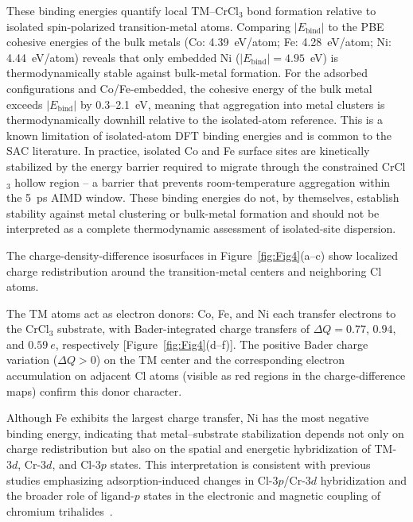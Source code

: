 \documentclass[journal=jacsat,manuscript=article]{achemso}
\begin{document}
These binding energies quantify local TM--CrCl$_3$ bond formation relative to isolated spin-polarized transition-metal atoms. {\color{revcolor}%
  Comparing $|E_{\mathrm{bind}}|$ to the PBE cohesive energies of the bulk metals (Co: 4.39~eV/atom; Fe: 4.28~eV/atom; Ni: 4.44~eV/atom) reveals that only embedded Ni ($|E_{\mathrm{bind}}| = 4.95$~eV) is thermodynamically stable against bulk-metal formation. For the adsorbed configurations and Co/Fe-embedded, the cohesive energy of the bulk metal exceeds $|E_{\mathrm{bind}}|$ by 0.3--2.1~eV, meaning that aggregation into metal clusters is thermodynamically downhill relative to the isolated-atom reference. This is a known limitation of isolated-atom DFT binding energies and is common to the SAC literature. In practice, isolated Co and Fe surface sites are kinetically stabilized by the energy barrier required to migrate through the constrained CrCl$_3$ hollow region -- a barrier that prevents room-temperature aggregation within the 5~ps AIMD window.
} These binding energies do not, by themselves, establish stability against metal clustering or bulk-metal formation and should not be interpreted as a complete thermodynamic assessment of isolated-site dispersion.

The charge-density-difference isosurfaces in Figure~\ref{fig:Fig4}(a--c) show localized charge redistribution around the transition-metal centers and neighboring Cl atoms. {\color{revcolor}%
  The TM atoms act as electron donors: Co, Fe, and Ni each transfer electrons to the CrCl$_3$ substrate, with Bader-integrated charge transfers of $\Delta Q = 0.77$, $0.94$, and $0.59~e$, respectively [Figure~\ref{fig:Fig4}(d--f)]. The positive Bader charge variation ($\Delta Q > 0$) on the TM center and the corresponding electron accumulation on adjacent Cl atoms (visible as red regions in the charge-difference maps) confirm this donor character.
\par} Although Fe exhibits the largest charge transfer, Ni has the most negative binding energy, indicating that metal--substrate stabilization depends not only on charge redistribution but also on the spatial and energetic hybridization of TM-$3d$, Cr-$3d$, and Cl-$3p$ states. This interpretation is consistent with previous studies emphasizing adsorption-induced changes in Cl-$3p$/Cr-$3d$ hybridization and the broader role of ligand-$p$ states in the electronic and magnetic coupling of chromium trihalides~\cite{Luo2020,Besbes2019}.
\end{document}
